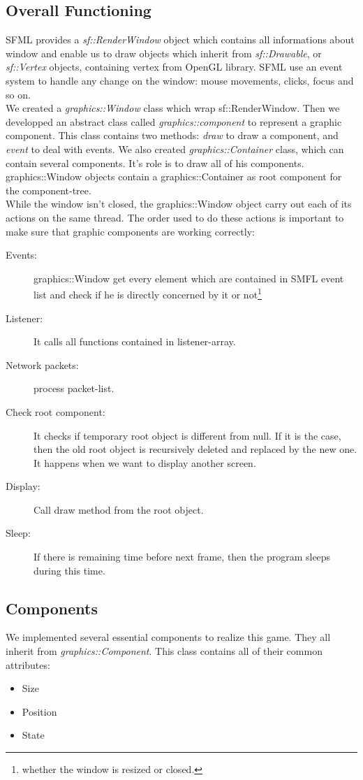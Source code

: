 \documentclass{scrreprt}
\begin{document}
		  \subsection{Overall Functioning} %
		  SFML provides a \emph{sf::RenderWindow} object which contains all informations about window and enable us to draw objects which inherit from \emph{sf::Drawable}, or \emph{sf::Vertex} objects, containing vertex from OpenGL library. SFML use an event system to handle any change on the window: mouse movements, clicks, focus and so on.\\

		  We created a \emph{graphics::Window} class which wrap sf::RenderWindow. Then we developped an abstract class called \emph{graphics::component} to represent a graphic component. This class contains two methods: \emph{draw} to draw a component, and \emph{event} to deal with events.
		  We also created \emph{graphics::Container} class, which can contain several components. It's role is to draw all of his components. graphics::Window objects contain a graphics::Container as root component for the component-tree.\\

		  While the window isn't closed, the graphics::Window object carry out each of its actions on the same thread. The order used to do these actions is important to make sure that graphic components are working correctly:
		  \begin{description}
		  \item[Events:]{graphics::Window get every element which are contained in SMFL event list and check if he is directly concerned by it or not\footnote{whether the window is resized or closed.}}
		  \item[Listener:]{It calls all functions contained in listener-array.}
		  \item[Network packets:]{process packet-list.}
		  \item[Check root component:] It checks if temporary root object is different from null. If it is the case, then the old root object is recursively deleted and replaced by the new one. It happens when we want to display another screen.
		  \item[Display:]{Call draw method from the root object.}
		  \item[Sleep:]{If there is remaining time before next frame, then the program sleeps during this time.}
		  \end{description}

		  \subsection{Components}
		  We implemented several essential components to realize this game. They all inherit from \emph{graphics::Component}. This class contains all of their common attributes:
		  \begin{itemize}
		  \item{Size}
		  \item{Position}
		  \item{State}
		  \end{itemize}
\end{document}
